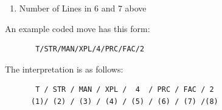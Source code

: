 \documentclass[conference]{IEEEtran}
\begin{document}
\begin{enumerate}
\item {Number of Lines in 6 and 7 above}
\end{enumerate}

An example coded move has this form:
\begin{verbatim}
       T/STR/MAN/XPL/4/PRC/FAC/2
\end{verbatim}

The interpretation is as follows:

\begin{flushleft}
\begin{verbatim}
       T / STR / MAN / XPL /  4  / PRC / FAC / 2
      (1)/ (2) / (3) / (4) / (5) / (6) / (7) /(8)
\end{verbatim}
\end{flushleft}
\end{document}
